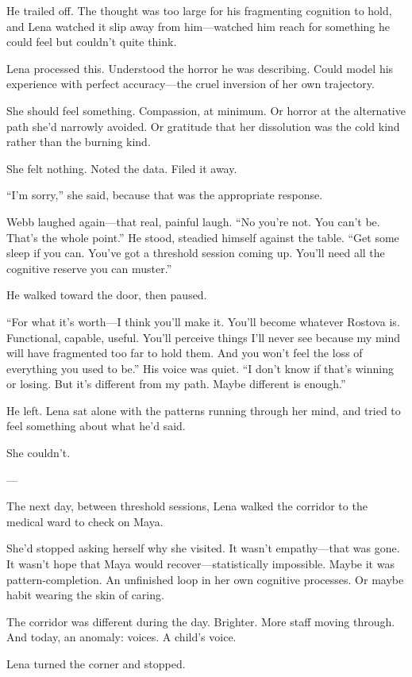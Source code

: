He trailed off. The thought was too large for his fragmenting cognition to hold, and Lena watched it slip away from him—watched him reach for something he could feel but couldn't quite think.

Lena processed this. Understood the horror he was describing. Could model his experience with perfect accuracy—the cruel inversion of her own trajectory.

She should feel something. Compassion, at minimum. Or horror at the alternative path she'd narrowly avoided. Or gratitude that her dissolution was the cold kind rather than the burning kind.

She felt nothing. Noted the data. Filed it away.

``I'm sorry,'' she said, because that was the appropriate response.

Webb laughed again—that real, painful laugh. ``No you're not. You can't be. That's the whole point.'' He stood, steadied himself against the table. ``Get some sleep if you can. You've got a threshold session coming up. You'll need all the cognitive reserve you can muster.''

He walked toward the door, then paused.

``For what it's worth—I think you'll make it. You'll become whatever Rostova is. Functional, capable, useful. You'll perceive things I'll never see because my mind will have fragmented too far to hold them. And you won't feel the loss of everything you used to be.'' His voice was quiet. ``I don't know if that's winning or losing. But it's different from my path. Maybe different is enough.''

He left. Lena sat alone with the patterns running through her mind, and tried to feel something about what he'd said.

She couldn't.

---

The next day, between threshold sessions, Lena walked the corridor to the medical ward to check on Maya.

She'd stopped asking herself why she visited. It wasn't empathy—that was gone. It wasn't hope that Maya would recover—statistically impossible. Maybe it was pattern-completion. An unfinished loop in her own cognitive processes. Or maybe habit wearing the skin of caring.

The corridor was different during the day. Brighter. More staff moving through. And today, an anomaly: voices. A child's voice.

Lena turned the corner and stopped.

